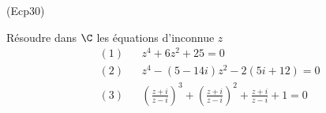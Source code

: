 \begin{tiny}(Ecp30)\end{tiny} Résoudre dans $\C$ les équations d'inconnue $z$
\begin{align*}
 &(1) & & z^4+6z^2+25=0\\
 &(2) & & z^4 -(5-14i)z^2 -2(5i+12) = 0 \\
 &(3) & &\left( \frac{z+i}{z-i}\right)^3 + \left( \frac{z+i}{z-i}\right)^2 + \frac{z+i}{z-i} + 1 = 0    
\end{align*}
